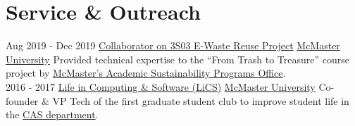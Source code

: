 \documentclass[letterpaper]{twentysecondcv} %
\begin{document}
\vspace{-1.5em}
\section{Service \& Outreach}
\vspace{-.5em}
\begin{twenty}
  \twentyitem
  {Aug 2019 -}
  {Dec 2019}
  {\href{https://asp.mcmaster.ca/wp-content/uploads/2020/10/McMaster-Sustainability-Programs-Office-1920-Annual-Report-VER_23.pdf\#page=33}{Collaborator on 3S03 E-Waste Reuse Project}}
  {\href{https://www.mcmaster.ca/}{McMaster University}}
  {}
  {Provided technical expertise to the ``From Trash to Treasure'' course project by \href{https://asp.mcmaster.ca/}{McMaster's Academic Sustainability Programs Office}.}
  \\
	\twentyitem
	{2016 - 2017}
	{}
	{\href{https://lics.cas.mcmaster.ca/node/17}{Life in Computing \& Software (LiCS)}}
	{\href{https://www.mcmaster.ca/}{McMaster University}}
	{}
	{Co-founder \& VP Tech of the first graduate student club to improve student life in the \href{https://www.eng.mcmaster.ca/cas}{CAS department}.
  }
\end{twenty}
\end{document}
